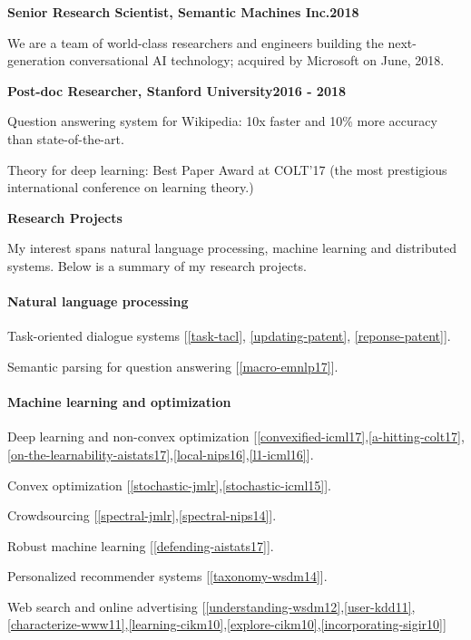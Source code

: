 \documentclass{res}
\newenvironment{my_item}{
\begin{itemize}
  \setlength{\itemsep}{0pt}
  \setlength{\parskip}{0pt}
  \setlength{\parsep}{0pt}}
{\end{itemize}
}
\begin{document}
\begin{resume}
{\bf Senior Research Scientist, Semantic Machines Inc.}\hfill\textbf{2018}
\begin{my_item}
\item We are a team of world-class researchers and engineers building the next-generation conversational AI technology; acquired by Microsoft on June,  2018.
\end{my_item}

{\bf Post-doc Researcher, Stanford University}\hfill\textbf{2016 - 2018}
\begin{my_item}
\item Question answering system for Wikipedia: 10x faster and 10\% more
accuracy than state-of-the-art.
\item Theory for deep learning: Best Paper Award at COLT'17 (the most prestigious international conference on learning theory.)  
\end{my_item}

{\bf\Large Research Projects}

My interest spans natural language processing,  machine learning and distributed systems.  Below is a summary
of my research projects.

\paragraph{Natural language processing}
\begin{my_item}
\item Task-oriented dialogue systems [\ref{task-tacl}, \ref{updating-patent}, \ref{reponse-patent}].
\item Semantic parsing for question answering [\ref{macro-emnlp17}].
\end{my_item}

\vspace{-5pt}
\paragraph{Machine learning and optimization}
\begin{my_item}
\item Deep learning and non-convex optimization [\ref{convexified-icml17},\ref{a-hitting-colt17},\ref{on-the-learnability-aistats17},\ref{local-nips16},\ref{l1-icml16}].
\item Convex optimization [\ref{stochastic-jmlr},\ref{stochastic-icml15}].
\item Crowdsourcing [\ref{spectral-jmlr},\ref{spectral-nips14}].
\item Robust machine learning [\ref{defending-aistats17}].
\item Personalized recommender systems [\ref{taxonomy-wsdm14}].
\item Web search and online advertising [\ref{understanding-wsdm12},\ref{user-kdd11},\ref{characterize-www11},\ref{learning-cikm10},\ref{explore-cikm10},\ref{incorporating-sigir10}]
\end{my_item}


\end{resume}
\end{document}
